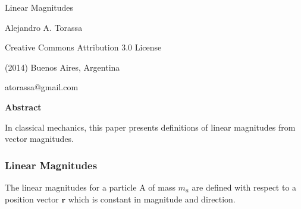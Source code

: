 \documentclass[10pt]{article}
\newcommand{\mM}{m}
\newcommand{\ra}{_a}
\newcommand{\vR}{\mathbf{r}}
\begin{document}
\begin{center}

{\LARGE Linear Magnitudes}

\bigskip \medskip

Alejandro A. Torassa

\bigskip \medskip

\footnotesize

Creative Commons Attribution 3.0 License

(2014) Buenos Aires, Argentina

atorassa@gmail.com

\bigskip \smallskip

\small

{\bf Abstract}

\bigskip

\parbox{81mm}{In classical mechanics, this paper presents definitions of linear magnitudes from vector magnitudes.}

\end{center}

\normalsize

\vspace{-0.60em}

{\centering\subsubsection*{Linear Magnitudes}}

\vspace{+0.60em}

\par The linear magnitudes for a particle A of mass $\mM\ra$ are defined with respect to a position vector $\vR$ which is constant in magnitude and direction.

\vspace{+1.20em}
\end{document}

